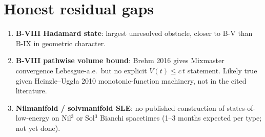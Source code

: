\documentclass[11pt,a4paper]{article}
\theoremstyle{definition}
\begin{document}
\section{Honest residual gaps}

\begin{enumerate}
  \item \textbf{B-VIII Hadamard state}: largest unresolved obstacle, closer
        to B-V than B-IX in geometric character.
  \item \textbf{B-VIII pathwise volume bound}: Brehm 2016 \cite{Brehm2016}
        gives Mixmaster convergence Lebesgue-a.e.\ but no explicit
        $V(t) \le c\,t$ statement. Likely true given Heinzle--Uggla 2010
        \cite{HU2010} monotonic-function machinery, not in the cited
        literature.
  \item \textbf{Nilmanifold / solvmanifold SLE}: no published construction
        of states-of-low-energy on Nil$^3$ or Sol$^3$ Bianchi spacetimes
        (1--3 months expected per type; not yet done).
\end{enumerate}
\end{document}
